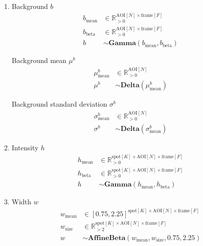 \begin{enumerate}
\item Background $b$
\begin{subequations}
\begin{align}
    b_\mathrm{mean} &\in \mathbb{R}_{>0}^{\mathrm{AOI}[N] \times \mathrm{frame}[F]} \\
    b_\mathrm{beta} &\in \mathbb{R}_{>0}^{\mathrm{AOI}[N] \times \mathrm{frame}[F]} \\
    b &\sim \mathbf{Gamma}(b_\mathrm{mean}, b_\mathrm{beta})
\end{align}
\end{subequations}

Background mean $\mu^b$
\begin{subequations}
\begin{align}
    \mu^b_\mathrm{mean} &\in \mathbb{R}_{>0}^{\mathrm{AOI}[N]} \\
    \mu^b &\sim \mathbf{Delta}(\mu^b_\mathrm{mean})
\end{align}
\end{subequations}

Background standard deviation $\sigma^b$
\begin{subequations}
\begin{align}
    \sigma^b_\mathrm{mean} &\in \mathbb{R}_{>0}^{\mathrm{AOI}[N]} \\
    \sigma^b &\sim \mathbf{Delta}(\sigma^b_\mathrm{mean})
\end{align}
\end{subequations}

\item Intensity $h$
\begin{subequations}
\begin{align}
    h_\mathrm{mean} &\in \mathbb{R}_{>0}^{\mathrm{spot}[K] \times \mathrm{AOI}[N] \times \mathrm{frame}[F]} \\
    h_\mathrm{beta} &\in \mathbb{R}_{>0}^{\mathrm{spot}[K] \times \mathrm{AOI}[N] \times \mathrm{frame}[F]} \\
    h &\sim \mathbf{Gamma}(h_\mathrm{mean}, h_\mathrm{beta})
\end{align}
\end{subequations}

\item Width $w$
\begin{subequations}
\begin{align}
    w_\mathrm{mean} &\in [0.75, 2.25]^{\mathrm{spot}[K] \times \mathrm{AOI}[N] \times \mathrm{frame}[F]} \\
    w_\mathrm{size} &\in \mathbb{R}_{>2}^{\mathrm{spot}[K] \times \mathrm{AOI}[N] \times \mathrm{frame}[F]} \\
    w &\sim \mathbf{AffineBeta}(w_\mathrm{mean}, w_\mathrm{size}, 0.75, 2.25)
\end{align}
\end{subequations}


\end{enumerate}

